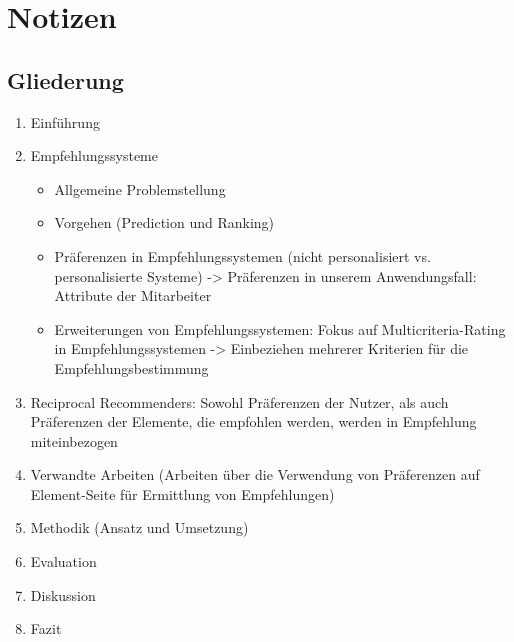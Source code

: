 \chapter{Notizen}
\label{ch:notizen}

\section{Gliederung}
\label{ch:notizen:gliederung}

\begin{enumerate}
    \item Einführung
    \item Empfehlungssysteme
    \begin{itemize}
        \item Allgemeine Problemstellung
        \item Vorgehen (Prediction und Ranking)
        \item Präferenzen in Empfehlungssystemen (nicht personalisiert vs. personalisierte Systeme) -> Präferenzen in unserem Anwendungsfall: Attribute der Mitarbeiter
        \item Erweiterungen von Empfehlungssystemen: Fokus auf Multicriteria-Rating in Empfehlungssystemen -> Einbeziehen mehrerer Kriterien für die Empfehlungsbestimmung %
    \end{itemize}
    \item Reciprocal Recommenders: Sowohl Präferenzen der Nutzer, als auch Präferenzen der Elemente, die empfohlen werden, werden in Empfehlung miteinbezogen %
    \item Verwandte Arbeiten (Arbeiten über die Verwendung von Präferenzen auf Element-Seite für Ermittlung von Empfehlungen)
    \item Methodik (Ansatz und Umsetzung)
    \item Evaluation
    \item Diskussion
    \item Fazit
\end{enumerate}

